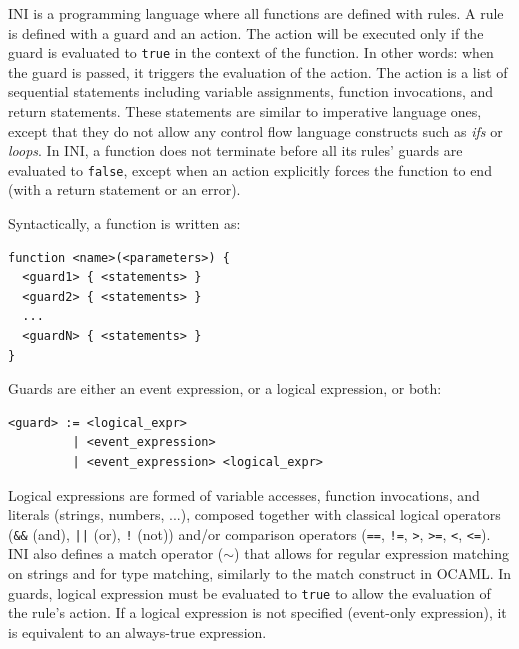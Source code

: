 \documentclass{sig-alternate}
\begin{document}
INI is a programming language where all functions are defined with rules. A rule is defined with a guard and an action. The action will be executed only if the guard is evaluated to \texttt{true} in the context of the function. In other words: when the guard is passed, it triggers the evaluation of the action. The action is a list of sequential statements including variable assignments, function invocations, and return statements. These statements are similar to imperative language ones, except that they do not allow any control flow language constructs such as \emph{ifs} or \emph{loops}. In INI, a function does not terminate before all its rules' guards are evaluated to \texttt{false}, except when an action explicitly forces the function to end (with a return statement or an error). 

Syntactically, a function is written as:

{ \small \begin{verbatim}
function <name>(<parameters>) { 
  <guard1> { <statements> }
  <guard2> { <statements> }
  ...  
  <guardN> { <statements> }
}
\end{verbatim} }

Guards are either an event expression, or a logical expression, or both:

{ \small \begin{verbatim}
<guard> := <logical_expr>
         | <event_expression>
         | <event_expression> <logical_expr>
\end{verbatim} }

Logical expressions are formed of variable accesses, function invocations, and literals (strings, numbers, ...), composed together with classical logical operators (\texttt{\&\&} (and), \texttt{||} (or), \texttt{!} (not)) and/or comparison operators (\texttt{==}, \texttt{!=}, \texttt{>}, \texttt{>=}, \texttt{<}, \texttt{<=}). INI also defines a match operator ($\sim$) that allows for regular expression matching on strings and for type matching, similarly to the match construct in OCAML. In guards, logical expression must be evaluated to \texttt{true} to allow the evaluation of the rule's action. If a logical expression is not specified (event-only expression), it is equivalent to an always-true expression.
\end{document}
